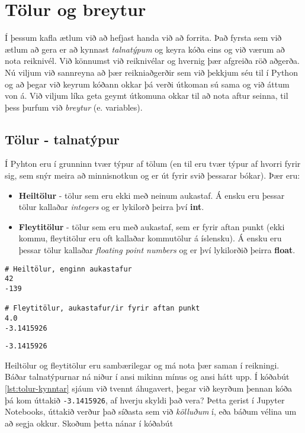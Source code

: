 
\chapter{Tölur og breytur}\label{k:tolur}
Í þessum kafla ætlum við að hefjast handa við að forrita. 
Það fyrsta sem við ætlum að gera er að kynnast \emph{talnatýpum} og keyra kóða eins og við værum að nota reiknivél. 
Við könnumst við reiknivélar og hvernig þær afgreiða röð aðgerða. 
Nú viljum við sannreyna að þær reikniaðgerðir sem við þekkjum séu til í Python og að þegar við keyrum kóðann okkar þá verði útkoman sú sama og við áttum von á. 
Við viljum líka geta geymt útkomuna okkar til að nota aftur seinna, til þess þurfum við \emph{breytur} (e. variables).

\section{Tölur - talnatýpur}
Í Pyhton eru í grunninn tvær týpur af tölum (en til eru tvær týpur af hvorri fyrir sig, sem snýr meira að minnisnotkun og er út fyrir svið þessarar bókar). 
Þær eru:

\begin{itemize}
	\item \textbf{Heiltölur} - tölur sem eru ekki með neinum aukastaf. 
	Á ensku eru þessar tölur kallaðar \textit{integers} og er lykilorð þeirra því \textbf{int}.
	\item \textbf{Fleytitölur} - tölur sem eru með aukastaf, sem er fyrir aftan punkt (ekki kommu, fleytitölur eru oft kallaðar kommutölur á íslensku). 
	Á ensku eru þessar tölur kallaðar \textit{floating point numbers} og er því lykilorðið þeirra \textbf{float}.
\end{itemize}

\begin{lstlisting}[caption=Heiltölur og fleytitölur, label=lst:tolur-kynntar]
# Heiltölur, enginn aukastafur
42
-139

# Fleytitölur, aukastafur/ir fyrir aftan punkt
4.0
-3.1415926
\end{lstlisting}
\lstset{style=uttak}
\begin{lstlisting}
-3.1415926
\end{lstlisting}
\lstset{style=venjulegt}

Heiltölur og fleytitölur eru sambærilegar og má nota þær saman í reikningi.
Báðar talnatýpurnar ná niður í ansi mikinn mínus og ansi hátt upp.
Í kóðabút \ref{lst:tolur-kynntar} sjáum við tvennt áhugavert, þegar við keyrðum þennan kóða þá kom úttakið \texttt{-3.1415926}, af hverju skyldi það vera?
Þetta gerist í Jupyter Notebooks, úttakið verður það síðasta sem við \emph{kölluðum} í, eða báðum vélina um að segja okkur.
Skoðum þetta nánar í kóðabút 

